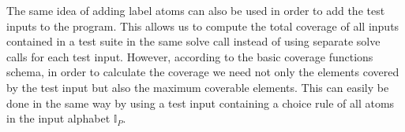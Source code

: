 The same idea of adding label atoms can also be used in order to add the test inputs to the program. This allows us to compute the total coverage of all inputs contained in a test suite in the same solve call instead of using separate solve calls for each test input. However, according to the basic coverage functions schema, in order to calculate the coverage we need not only the elements covered by the test input but also the maximum coverable elements. This can easily be done in the same way by using a test input containing a choice rule of all atoms in the input alphabet $\mathbb{I}_P$. 

